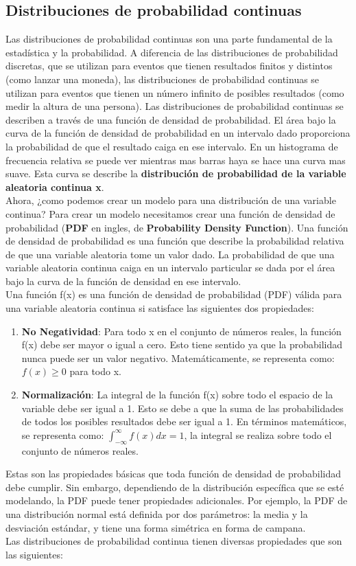 \documentclass[]{article}
\begin{document}
\subsection{Distribuciones de probabilidad continuas}
Las distribuciones de probabilidad continuas son una parte fundamental de la estadística y la probabilidad. A diferencia de las distribuciones de probabilidad discretas, que se utilizan para eventos que tienen resultados finitos y distintos (como lanzar una moneda), las distribuciones de probabilidad continuas se utilizan para eventos que tienen un número infinito de posibles resultados (como medir la altura de una persona). Las distribuciones de probabilidad continuas se describen a través de una función de densidad de probabilidad. El área bajo la curva de la función de densidad de probabilidad en un intervalo dado proporciona la probabilidad de que el resultado caiga en ese intervalo. En un histograma de frecuencia relativa se puede ver mientras mas barras haya se hace una curva mas suave. Esta curva se describe la \textbf{distribución de probabilidad de la variable aleatoria continua x}.
\\ Ahora, ¿como podemos crear un modelo para una distribución de una variable continua?
Para crear un modelo necesitamos crear una función de densidad de probabilidad (\textbf{PDF} en ingles, de \textbf{Probability Density Function}).
Una función de densidad de probabilidad es una función que describe la probabilidad relativa de que una variable aleatoria tome un valor dado. La probabilidad de que una variable aleatoria continua caiga en un intervalo particular se dada por el área bajo la curva de la función de densidad en ese intervalo.
\\
Una función f(x) es una función de densidad de probabilidad (PDF) válida para una variable aleatoria continua si satisface las siguientes dos propiedades:
\begin{enumerate}
	\item \textbf{No Negatividad}: Para todo x en el conjunto de números reales, la función f(x) debe ser mayor o igual a cero. Esto tiene sentido ya que la probabilidad nunca puede ser un valor negativo. Matemáticamente, se representa como: $f(x) \geq 0$ para todo x.
	\item \textbf{Normalización}: La integral de la función f(x) sobre todo el espacio de la variable debe ser igual a 1. Esto se debe a que la suma de las probabilidades de todos los posibles resultados debe ser igual a 1. En términos matemáticos, se representa como: $ \int_{-\infty}^{\infty}f(x)dx = 1 $, la integral se realiza sobre todo el conjunto de números reales.
\end{enumerate}
Estas son las propiedades básicas que toda función de densidad de probabilidad debe cumplir. Sin embargo, dependiendo de la distribución específica que se esté modelando, la PDF puede tener propiedades adicionales. Por ejemplo, la PDF de una distribución normal está definida por dos parámetros: la media y la desviación estándar, y tiene una forma simétrica en forma de campana.
\\
Las distribuciones de probabilidad continua tienen diversas propiedades que son las siguientes:
\end{document}
